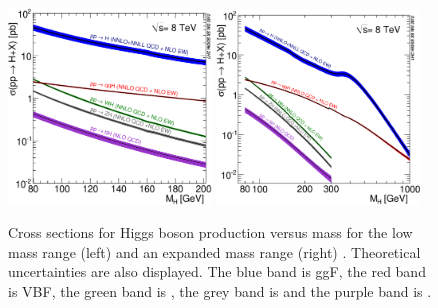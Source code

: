 \begin{figure}
	\includegraphics[width=0.48\textwidth]{tex/motivation/xs_lowrange}
	\hfill
	\includegraphics[width=0.48\textwidth]{tex/motivation/xs_fullrange}
	\caption{Cross sections for Higgs boson production versus mass for the low mass range (left) and an expanded mass range (right) \cite{YR2}. Theoretical uncertainties are also displayed. The blue band is \ac{ggF}, the red band is \ac{VBF}, the green band is \WH, the grey band is \ZH and the purple band is \ttH.}
	\label{fig:higgs_xs}
\end{figure}

